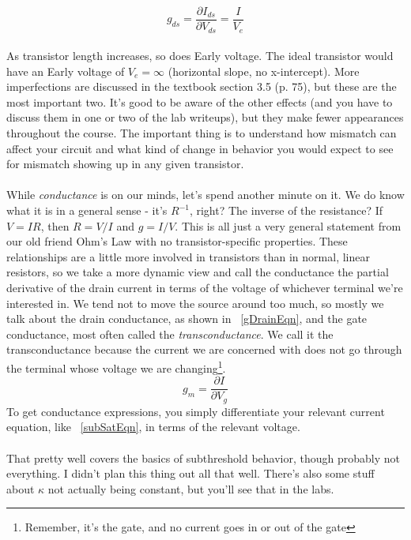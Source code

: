 \documentclass[main]{subfiles}
\begin{document}
\begin{equation}
g_{ds} = \frac{\partial I_{ds}}{\partial V_{ds}} = \frac{I}{V_e}
\label{gDrainEqn}
\end{equation}
\\
As transistor length increases, so does Early voltage. The ideal transistor would have an Early voltage of $V_e = \infty$ (horizontal slope, no x-intercept). More imperfections are discussed in the textbook section 3.5 (p. 75), but these are the most important two. It's good to be aware of the other effects (and you have to discuss them in one or two of the lab writeups), but they make fewer appearances throughout the course. The important thing is to understand how mismatch can affect your circuit and what kind of change in behavior you would expect to see for mismatch showing up in any given transistor.\\ \\
While \emph{conductance} is on our minds, let's spend another minute on it. We do know what it is in a general sense - it's $R^{-1}$, right? The inverse of the resistance? If $V = IR$, then $R = V/I$ and $g = I/V$. This is all just a very general statement from our old friend Ohm's Law with no transistor-specific properties. These relationships are a little more involved in transistors than in normal, linear resistors, so we take a more dynamic view and call the conductance the partial derivative of the drain current in terms of the voltage of whichever terminal we're interested in. We tend not to move the source around too much, so mostly we talk about the drain conductance, as shown in ~\eqref{gDrainEqn}, and the gate conductance, most often called the \emph{transconductance}. We call it the transconductance because the current we are concerned with does not go through the terminal whose voltage we are changing\footnote{Remember, it's the gate, and no current goes in or out of the gate}.
\begin{equation}
g_{m} = \frac{\partial I}{\partial V_{g}}
\label{gTransEqn}
\end{equation}
To get conductance expressions, you simply differentiate your relevant current equation, like ~\eqref{subSatEqn}, in terms of the relevant voltage.\\ \\
That pretty well covers the basics of subthreshold behavior, though probably not everything. I didn't plan this thing out all that well. There's also some stuff about $\kappa$ not actually being constant, but you'll see that in the labs.\\
\end{document}
